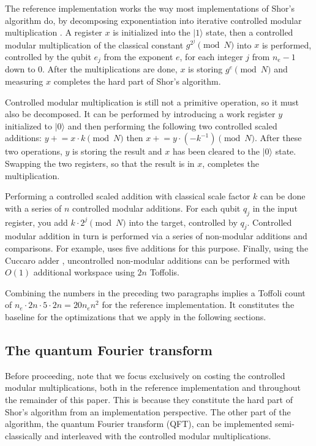 \documentclass[superscriptaddress,notitlepage,longbibliography]{revtex4-1}
\theoremstyle{definition}
\theoremstyle{definition}
\newcommand{\lenexp}{{n_e}}
\newcommand{\productreg}{x}
\newcommand{\workreg}{y}
\newcommand{\gen}{g}
\begin{document}
The reference implementation works the way most implementations of Shor's algorithm do, by decomposing exponentiation into iterative controlled modular multiplication \cite{vedral1996arithmetic, zalka1998fast, zalka2006pure, beauregard2002shor, haner2016factoring, gidney2017factoring}.
A register $\productreg$ is initialized into the $|1\rangle$ state, then a controlled modular multiplication of the classical constant $\gen^{2^j} \pmod{N}$ into $\productreg$ is performed, controlled by the qubit $e_j$ from the exponent $e$, for each integer $j$ from $\lenexp-1$ down to $0$.
After the multiplications are done, $\productreg$ is storing $\gen^e \pmod{N}$ and measuring $\productreg$ completes the hard part of Shor's algorithm.

Controlled modular multiplication is still not a primitive operation, so it must also be decomposed.
It can be performed by introducing a work register $\workreg$ initialized to $|0\rangle$ and then performing the following two controlled scaled additions: $\workreg \mathrel{+}= \productreg \cdot k \pmod{N}$ then $\productreg \mathrel{+}= \workreg \cdot (-k^{-1}) \pmod{N}$.
After these two operations, $\workreg$ is storing the result and $\productreg$ has been cleared to the $|0\rangle$ state.
Swapping the two registers, so that the result is in $\productreg$, completes the multiplication.

Performing a controlled scaled addition with classical scale factor $k$ can be done with a series of $n$ controlled modular additions.
For each qubit $q_j$ in the input register, you add $k \cdot 2^j \pmod{N}$ into the target, controlled by $q_j$.
Controlled modular addition in turn is performed via a series of non-modular additions and comparisons.
For example, \cite{vedral1996arithmetic} uses five additions for this purpose.
Finally, using the Cuccaro adder \cite{cuccaro2004adder}, uncontrolled non-modular additions can be performed with $O(1)$ additional workspace using $2n$ Toffolis.

Combining the numbers in the preceding two paragraphs implies a Toffoli count of $\lenexp \cdot 2n \cdot 5 \cdot 2n = 20 \lenexp n^2$ for the reference implementation.
It constitutes the baseline for the optimizations that we apply in the following sections.

\subsection{The quantum Fourier transform}
Before proceeding, note that we focus exclusively on costing the controlled modular multiplications, both in the reference implementation and throughout the remainder of this paper.
This is because they constitute the hard part of Shor's algorithm from an implementation perspective.
The other part of the algorithm, the quantum Fourier transform (QFT), can be implemented semi-classically \cite{griffiths1996semiclassical} and interleaved with the controlled modular multiplications.
\end{document}
